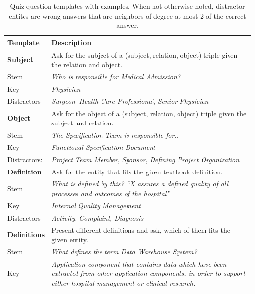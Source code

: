 \documentclass{IOS-Book-Article}     %
\begin{document}
\begin{table}[t]
\caption{Quiz question templates with examples. When not otherwise noted, distractor entites are wrong answers that are neighbors of degree at most 2 of the correct answer.}%
\label{tab:templates}
\centering
\begin{tabulary}{\columnwidth}{lL}
\toprule
\textbf{Template}	&\textbf{Description}\\
\midrule
\textbf{Subject}		&Ask for the subject of a (subject, relation, object) triple given the relation and object.\\
Stem					&\emph{Who is responsible for Medical Admission?}\\
Key						&\emph{Physician}\\
Distractors				&\emph{Surgeon}, \emph{Health Care Professional}, \emph{Senior Physician}\\
\midrule
\textbf{Object}			&Ask for the object of a (subject, relation, object) triple given the subject and relation.\\
Stem					&\emph{The Specification Team is responsible for}$\ldots$\\
Key						&\emph{Functional Specification Document}\\
Distractors: 			&\emph{Project Team Member}, \emph{Sponsor}, \emph{Defining Project Organization}\\
\midrule
\textbf{Definition}		&Ask for the entity that fits the given textbook definition.\\
Stem					&\emph{What is defined by this? \enquote{X assures a defined quality of all processes and outcomes of the hospital}}\\
Key						&\emph{Internal Quality Management}\\
Distractors				&\emph{Activity}, \emph{Complaint}, \emph{Diagnosis}\\
\midrule
\textbf{Definitions}	&Present different definitions and ask, which of them fits the given entity.\\
Stem					&\emph{What defines the term Data Warehouse System?}\\
Key						&\emph{Application component that contains data which have been extracted from other application components, in order to support either hospital management or clinical research.}\\

\end{tabulary}
\end{table}
\end{document}
